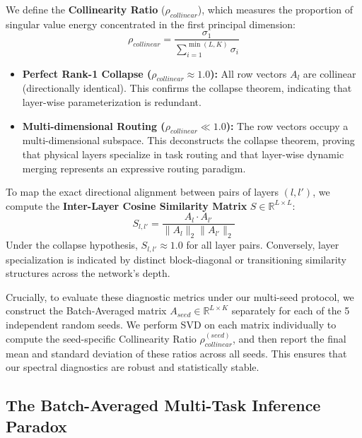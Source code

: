 We define the \textbf{Collinearity Ratio} ($\rho_{collinear}$), which measures the proportion of singular value energy concentrated in the first principal dimension:
\begin{equation}
\rho_{collinear} = \frac{\sigma_1}{\sum_{i=1}^{\min(L, K)} \sigma_i}
\end{equation}
\begin{itemize}
    \item \textbf{Perfect Rank-1 Collapse ($\rho_{collinear} \approx 1.0$):} All row vectors $A_l$ are collinear (directionally identical). This confirms the collapse theorem, indicating that layer-wise parameterization is redundant.
    \item \textbf{Multi-dimensional Routing ($\rho_{collinear} \ll 1.0$):} The row vectors occupy a multi-dimensional subspace. This deconstructs the collapse theorem, proving that physical layers specialize in task routing and that layer-wise dynamic merging represents an expressive routing paradigm.
\end{itemize}

To map the exact directional alignment between pairs of layers $(l, l')$, we compute the \textbf{Inter-Layer Cosine Similarity Matrix} $S \in \mathbb{R}^{L \times L}$:
\begin{equation}
S_{l, l'} = \frac{A_l \cdot A_{l'}}{\|A_l\|_2 \|A_{l'}\|_2}
\end{equation}
Under the collapse hypothesis, $S_{l, l'} \approx 1.0$ for all layer pairs. Conversely, layer specialization is indicated by distinct block-diagonal or transitioning similarity structures across the network's depth.

Crucially, to evaluate these diagnostic metrics under our multi-seed protocol, we construct the Batch-Averaged matrix $A_{seed} \in \mathbb{R}^{L \times K}$ separately for each of the 5 independent random seeds. We perform SVD on each matrix individually to compute the seed-specific Collinearity Ratio $\rho_{collinear}^{(seed)}$, and then report the final mean and standard deviation of these ratios across all seeds. This ensures that our spectral diagnostics are robust and statistically stable.

\subsection{The Batch-Averaged Multi-Task Inference Paradox}
\label{subsec:batch_averaged_paradox}

